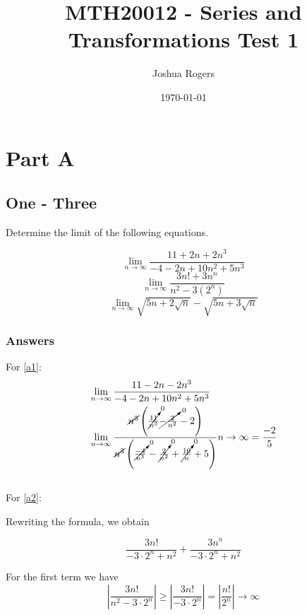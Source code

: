 \documentclass{article}
\title{\vspace{-4cm}MTH20012 - Series and Transformations Test 1}
\author{Joshua Rogers}
\date\today
\begin{document}
\maketitle 

\section*{Part A}
\subsection*{One - Three}

Determine the limit of the following equations.

\begin{equation}\label{a1}
\lim_{n\to\infty} \frac{11+2n+2n^3}{-4-2n+10n^2+5n^3}
\end{equation}
\begin{equation}\label{a2}
\lim_{n\to\infty} \frac{3n!+3n^n}{n^2-3(2^n)}
\end{equation}
\begin{equation}\label{a3}
\lim_{n\to\infty} \sqrt{5n+2\sqrt{n}}-\sqrt{5n+3\sqrt{n}}
\end{equation}


\subsubsection*{Answers}

For \ref{a1}:
\begin{align*}
&\lim_{n\to\infty} \frac {11-2n-2n^3}{-4-2n+10n^2+5n^3}\\
&\lim_{n\to\infty} \frac{ \cancel{n^3} \left(\cancelto{0}{\frac{11}{n^3}}\cancelto{0}{-\frac{2}{n^2}}-2\right)}{\cancel{n^3} \left(\cancelto{0}{\frac{-4}{n^3}}-\cancelto{0}{\frac{2}{n^2}}+\cancelto{0}{\frac{10}{n}}+5\right)} n \rightarrow \infty = \frac{-2}{5}
\end{align*}
\par

\subsection*{}

For \ref{a2}:

Rewriting the formula, we obtain

\[
\frac{3n!}{-3 \cdot 2^n + n^2} + \frac{3n^n}{-3 \cdot 2^n + n^2}
\]

For the first term we have
\[
\left|\frac{3n!}{n^2-3 \cdot 2^n}\right| \geq \left| \frac{3n!}{-3 \cdot 2^n} \right| = \left|\frac{n!}{2^n}\right| \rightarrow \infty
\]
\end{document}
